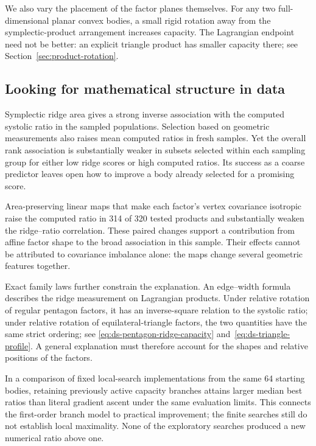 We also vary the placement of the factor planes themselves. For any two
full-dimensional planar convex bodies, a small rigid rotation away from the
symplectic-product arrangement increases capacity. The Lagrangian endpoint
need not be better: an explicit triangle product has smaller capacity there;
see Section~\ref{sec:product-rotation}.

\subsection{Looking for mathematical structure in data}

Symplectic ridge area gives a strong inverse association with the computed
systolic ratio in the sampled populations. Selection based on geometric
measurements also raises mean computed ratios in fresh samples. Yet the
overall rank association is substantially weaker in subsets selected within each sampling group for
either low ridge scores or high computed ratios. Its success as a coarse
predictor leaves open how to improve a body already selected for a promising
score.

Area-preserving linear maps that make each factor's vertex covariance
isotropic raise the computed ratio in 314 of 320 tested products and
substantially weaken the ridge--ratio correlation. These paired changes
support a contribution from affine factor shape to the broad association
in this sample. Their effects cannot
be attributed to covariance imbalance alone: the maps change several
geometric features together.

Exact family laws further constrain the explanation. An edge--width formula
describes the ridge measurement on Lagrangian products. Under relative
rotation of regular pentagon factors, it has an inverse-square relation to
the systolic ratio; under relative rotation of equilateral-triangle factors,
the two quantities have the same strict ordering; see
\eqref{eq:ds-pentagon-ridge-capacity} and~\eqref{eq:ds-triangle-profile}.
A general explanation must therefore account
for the shapes and relative positions of the factors.

In a comparison of fixed local-search implementations from the same
64 starting bodies, retaining previously active capacity branches attains larger median best ratios than literal
gradient ascent under the same evaluation limits. This connects the
first-order branch model to practical improvement; the finite searches still
do not establish local maximality. None of the exploratory searches produced
a new numerical ratio above one.

